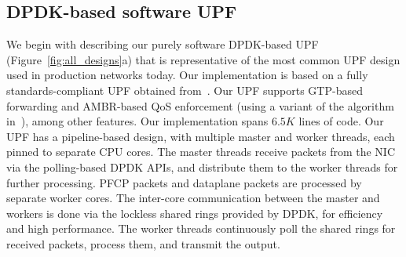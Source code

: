 \vspace{-3mm}
\subsection{DPDK-based software UPF} 
\label{sub:swUPF}

We begin with describing our purely software DPDK-based UPF (Figure~\ref{fig:all_designs}a) that is representative of the most common UPF design used in production networks today. Our implementation is based on a fully standards-compliant UPF obtained from~\cite{5g-testbed, 5g-testbed-in}. Our UPF supports GTP-based forwarding and AMBR-based QoS enforcement (using a variant of the algorithm in~\cite{carousel}), among other features. Our implementation spans $6.5K$ lines of code. Our UPF has a pipeline-based design, with multiple master and worker threads, each pinned to separate CPU cores. The master threads receive packets from the NIC via the polling-based DPDK APIs, and distribute them to the worker threads for further processing. PFCP packets and dataplane packets are processed by separate worker cores. The inter-core communication between the master and workers is done via the lockless shared rings provided by DPDK, for efficiency and high performance. The worker threads continuously poll the shared rings for received packets, process them, and transmit the output.

